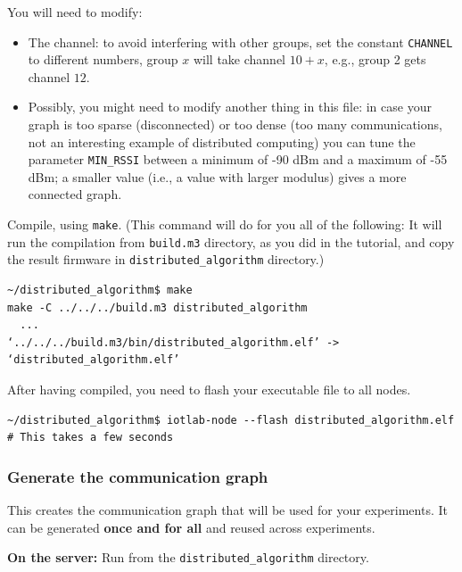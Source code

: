 \documentclass[oneside]{article}
\begin{document}
    
You will need to modify:
		\begin{itemize}
		\item The channel: to avoid interfering with other groups, set the
            constant \verb=CHANNEL= to different numbers, group $x$ will 					take channel $10+x$, e.g., group 2 gets channel $12$.
		\item Possibly, you might  need to modify another thing in this file:
		in case your graph is too sparse (disconnected) 
		or too dense (too many communications, 
		not an interesting example of distributed computing)
		you can tune the parameter \verb=MIN_RSSI=
		between a minimum of -90 dBm and a maximum of -55 dBm; 
		a smaller value (i.e., a value with larger modulus) gives a more connected graph.
        \end{itemize}

Compile, using \verb=make=.
    (This command will do for you all of the following: It will run the compilation from \verb=build.m3= directory, as you did in the tutorial, and copy the result firmware in \verb=distributed_algorithm= directory.)
    \begin{verbatim}~/distributed_algorithm$ make
make -C ../../../build.m3 distributed_algorithm
  ...
‘../../../build.m3/bin/distributed_algorithm.elf’ -> ‘distributed_algorithm.elf’
\end{verbatim}

After having compiled, you need to flash your executable file to all nodes.
    \begin{verbatim}~/distributed_algorithm$ iotlab-node --flash distributed_algorithm.elf
# This takes a few seconds
\end{verbatim}

      


\subsubsection{Generate the communication graph}

This creates the communication graph that
will be used for your experiments. It can be generated \textbf{once and for all} and
reused across experiments.

\textbf{On the server:}
Run from the \verb=distributed_algorithm= directory.
\end{document}
